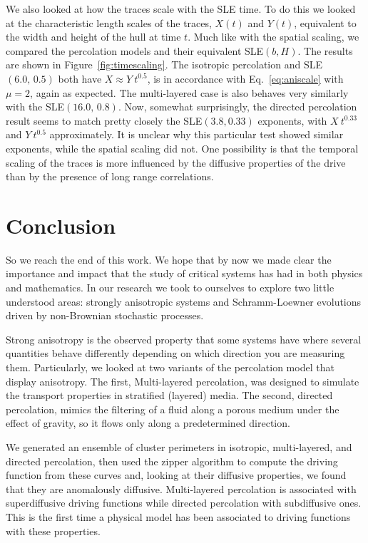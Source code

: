 We also looked at how the traces scale with the SLE time. To do this we looked
at the characteristic length scales of the traces, $X(t)$ and $Y(t)$,
equivalent to the width and height of the hull at time $t$. Much like with the
spatial scaling, we compared the percolation models and their equivalent
SLE$(b,H)$. The results are shown in Figure~\ref{fig:timescaling}. The
isotropic percolation and SLE$(6.0,\, 0.5)$ both have $X\approx Y~t^{0.5}$, is
in accordance with Eq.~\ref{eq:aniscale} with $\mu=2$, again as expected. The
multi-layered case is also behaves very similarly with the SLE$(16.0,\,0.8)$.
Now, somewhat surprisingly, the directed percolation result seems to match
pretty closely the SLE$(3.8, 0.33)$ exponents, with $X~t^{0.33}$ and
$Y~t^{0.5}$ approximately. It is unclear why this particular test showed
similar exponents, while the spatial scaling did not. One possibility is that
the temporal scaling of the traces is more influenced by the diffusive
properties of the drive than by the presence of long range correlations.


\chapter{Conclusion}
\label{sec:concl}

So we reach the end of this work. We hope that by now we made clear the
importance and impact that the study of critical systems has had in both
physics and mathematics. In our research we took to ourselves to explore two
little understood areas: strongly anisotropic systems and Schramm-Loewner
evolutions driven by non-Brownian stochastic processes.

Strong anisotropy is the observed property that some systems have where several
quantities behave differently depending on which direction you are measuring
them. Particularly, we looked at two variants of the percolation model that
display anisotropy. The first, Multi-layered percolation, was designed to
simulate the transport properties in stratified (layered) media. The second,
directed percolation, mimics the filtering of a fluid along a porous medium
under the effect of gravity, so it flows only along a predetermined direction.

We generated an ensemble of cluster perimeters in isotropic, multi-layered, and
directed percolation, then used the zipper algorithm to compute the driving
function from these curves and, looking at their diffusive properties, we found
that they are anomalously diffusive. Multi-layered percolation is associated
with superdiffusive driving functions while directed percolation with
subdiffusive ones. This is the first time a physical model has been associated
to driving functions with these properties.

